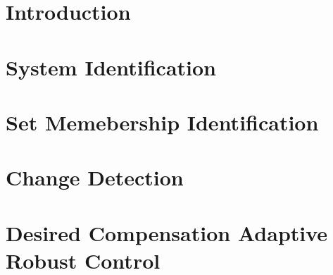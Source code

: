 \chapter{Introduction}
\chapter{System Identification}
\chapter{Set Memebership Identification}
\chapter{Change Detection}
\chapter{Desired Compensation Adaptive Robust Control}
